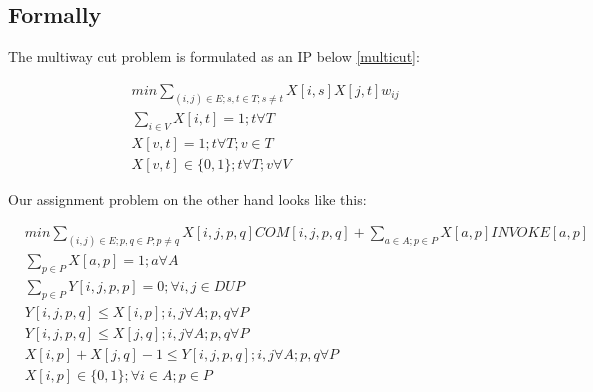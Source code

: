 \documentclass{article}
\begin{document}
\subsection*{Formally}

The multiway cut problem is formulated as an IP below \eqref{multicut}:

\begin{equation}\label{multicut}
\begin{split}
& min \sum_{(i,j) \in E; s, t \in T; s \neq t}{X[i,s] X[j,t] w_{ij}} \\
& \sum_{i \in V}{X[i,t]} = 1; t \forall T \\
& X[v,t] = 1; t \forall T ; v \in T \\
& X[v,t] \in \{0,1\};  t \forall T ; v \forall V
\end{split}
\end{equation}

Our assignment problem on the other hand looks like this:

\begin{equation}\label{assignment}
\begin{split}
& min \sum_{(i,j) \in E; p, q \in P; p \neq q}{X[i,j,p,q] COM[i,j,p,q]} + \sum_{a \in A; p \in P}{X[a,p] INVOKE[a,p]}\\
& \sum_{p \in P}{X[a,p]} = 1; a \forall A \\
& \sum_{p \in P}{Y[i,j,p,p]} = 0; \forall i,j \in DUP \\
& Y[i,j,p,q] \leq X[i,p]; i,j \forall A; p,q \forall P \\
& Y[i,j,p,q] \leq X[j,q]; i,j \forall A; p,q \forall P \\
& X[i,p] + X[j,q] - 1 \leq Y[i,j,p,q]; i,j \forall A; p,q \forall P \\
& X[i,p] \in \{0,1\};  \forall i \in A; p \in P
\end{split}
\end{equation}



\end{document}
